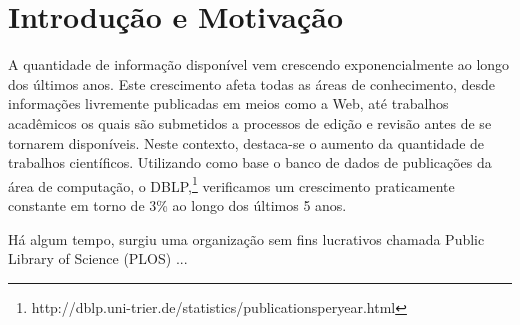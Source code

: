 \chapter{Introdução e Motivação}
A quantidade de informação disponível vem crescendo exponencialmente ao longo dos últimos anos. Este crescimento afeta todas as áreas de conhecimento, desde informações livremente publicadas em meios como a Web, até trabalhos acadêmicos os quais são submetidos a processos de edição e revisão antes de se tornarem disponíveis. Neste contexto, destaca-se o aumento da quantidade de trabalhos científicos. Utilizando como base o banco de dados de publicações da área de computação, o DBLP,\footnote{http://dblp.uni-trier.de/statistics/publicationsperyear.html} verificamos um crescimento praticamente constante em torno de 3\% ao longo dos últimos 5 anos.

Há algum tempo, surgiu uma organização sem fins lucrativos chamada Public Library of Science (PLOS) \cite{Plos2017Online} ...